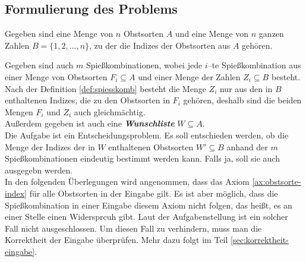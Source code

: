 \subsection{Formulierung des Problems}\label{sec:formulierung}


Gegeben sind eine Menge von $n$ Obstsorten $A$ und eine Menge von $n$ ganzen Zahlen
$B = \{1, 2, ..., n\}$, zu der die Indizes der Obstsorten aus $A$ gehören.



Gegeben sind auch $m$ Spießkombinationen, wobei jede $i$--te Spießkombination
aus einer Menge von Obstsorten $F_i \subseteq A$ und einer Menge der Zahlen $Z_i \subseteq B$ besteht. 
Nach der Definition \ref{def:spiesskomb} besteht die Menge $Z_i$ nur aus
den in $B$ enthaltenen Indizes, die zu den Obstsorten in $F_i$ gehören, deshalb sind die beiden Mengen
$F_i$ und $Z_i$ auch gleichmächtig.\\
Außerdem gegeben ist auch eine \textit{\textbf{Wunschliste}} $W \subseteq A$.\\

Die Aufgabe ist ein Entscheidungsproblem. Es soll entschieden werden,
ob die Menge der Indizes der in $W$ enthaltenen Obstsorten $W' \subseteq B$ anhand der $m$ 
Spießkombinationen eindeutig bestimmt werden kann. Falls ja, soll sie auch ausgegebn werden.\\

In den folgenden Überlegungen wird angenommen, dass das Axiom \ref{ax:obstsorte-index} für alle
Obstsorten in der Eingabe gilt.
Es ist aber möglich, dass die Spießkombination in einer Eingabe diesem Axiom nicht folgen, das heißt,
es an einer Stelle einen Widersprcuh gibt.
Laut der Aufgabenstellung ist ein solcher Fall nicht ausgeschlossen. 
Um diesen Fall zu verhindern, muss man die Korrektheit der Eingabe überprüfen. 
Mehr dazu folgt im Teil \ref{sec:korrektheit-eingabe}.
